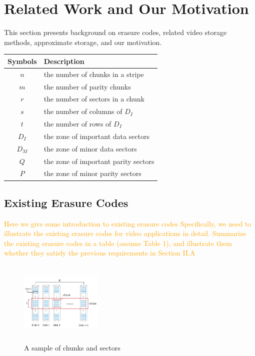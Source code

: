 \documentclass[sigconf]{acmart}
\begin{document}
\section{Related Work and Our Motivation}\label{RelatedWork}
This section presents background on erasure codes, related video storage methods, approximate storage, and our motivation.

\begin{table}[]
\begin{tabular}{|c|l|}
\hline
Symbols & Description                          \\ \hline\hline
$n$     & the number of chunks in a stripe     \\ \hline
$m$     & the number of parity chunks          \\ \hline
$r$     & the number of sectors in a chunk     \\ \hline
$s$     & the number of columns of $D_I$       \\ \hline
$t$     & the number of rows of $D_I$          \\ \hline
$D_I$   & the zone of important data sectors   \\ \hline
$D_M$   & the zone of minor data sectors       \\ \hline
$Q$     & the zone of important parity sectors \\ \hline
$P$     & the zone of minor parity sectors     \\ \hline
\end{tabular}
\end{table}

\subsection{Existing Erasure Codes}

\textcolor{orange}{Here we give some introduction to existing erasure codes
Specifically, we need to illustrate the existing erasure codes for video applications in detail.
Summarize the existing erasure codes in a table (assume Table 1), and illustrate them whether they satisfy the previous requirements in Section II.A}


\begin{figure}[ht]
\centering
\includegraphics[width=0.35\textwidth,height=40mm]{photo/chunk-sector.JPG}
\caption{A sample of chunks and sectors}
\label{chunk-sector}
\end{figure}
\end{document}
